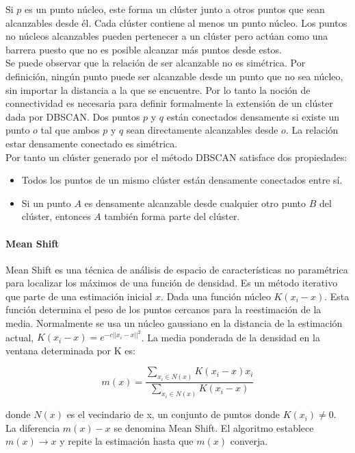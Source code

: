 \documentclass[a4paper, 20pt]{article}
\begin{document}
Si $p$ es un punto núcleo, este forma un clúster junto a otros puntos que sean alcanzables desde él. Cada clúster contiene al menos un punto núcleo. Los puntos no núcleos alcanzables pueden pertenecer a un clúster pero actúan como una barrera puesto que no es posible alcanzar más puntos desde estos.\\

Se puede observar que la relación de ser alcanzable no es simétrica. Por definición, ningún punto puede ser alcanzable desde un punto que no sea núcleo, sin importar la distancia a la que se encuentre. Por lo tanto la noción de connectividad es necesaria para definir formalmente la extensión de un clúster dada por DBSCAN. Dos puntos $p$ y $q$ están conectados densamente si existe un punto $o$ tal que ambos $p$ y $q$ sean directamente alcanzables desde $o$. La relación estar densamente conectado es simétrica.\\

Por tanto un clúster generado por el método DBSCAN satisface dos propiedades:

\begin{itemize}
\item Todos los puntos de un mismo clúster están densamente conectados entre sí.
\item Si un punto $A$ es densamente alcanzable desde cualquier otro punto $B$ del clúster, entonces $A$ también forma parte del clúster.
\end{itemize}

\paragraph{Mean Shift}

Mean Shift es una técnica de análisis de espacio de características no paramétrica para localizar los máximos de una función de densidad. Es un método iterativo que parte de una estimación inicial $x$. Dada una función núcleo $K(x_i-x)$. Esta función determina el peso de los puntos cercanos para la reestimación de la media. Normalmente se usa un núcleo gaussiano en la distancia de la estimación actual, $K(x_i-x)=e^{-c||x_i-x||^2}$. La media ponderada de la densidad en la ventana determinada por K es:

$$m(x)=\dfrac{\sum_{x_i\in N(x)}K(x_i-x)x_i}{\sum_{x_i\in N(x)}K(x_i-x)}$$

donde $N(x)$ es el vecindario de x, un conjunto de puntos donde $K(x_i)\neq0$.\\

La diferencia $m(x)-x$ se denomina Mean Shift. El algoritmo establece $m(x)\rightarrow x$ y repite la estimación hasta que $m(x)$ converja.\\
\end{document}
